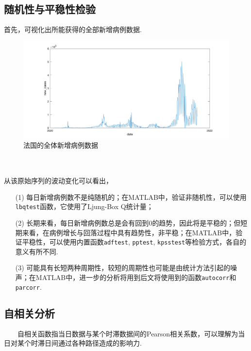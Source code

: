 \documentclass[a4paper, titlepage]{article}
\begin{document}
        \subsection{随机性与平稳性检验}
        首先，可视化出所能获得的全部新增病例数据.\\
\begin{minipage}{\textwidth}
\begin{figure}[H]
    \centering
    \includegraphics[width=\textwidth]{./images/France_Whole.png}
    \vspace{-3em}
    \caption{法国的全体新增病例数据}
    \label{images:France_Whole}
\end{figure}
\end{minipage}\\\quad\\
从该原始序列的波动变化可以看出，
\begin{enumerate}[itemsep=-2pt,topsep=1pt]
    \item [(1)] 每日新增病例数不是纯随机的；{\kaishu 在MATLAB中，验证非随机性，可以使用\texttt{lbqtest}函数，它使用了Ljung-Box Q统计量；}
    \item [(2)] 长期来看，每日新增病例数总是会有回到$0$的趋势，因此将是平稳的；但短期来看，在病例增长与回落过程中具有趋势性，非平稳；{\kaishu 在MATLAB中，验证平稳性，可以使用内置函数\texttt{adftest}, \texttt{pptest}, \texttt{kpsstest}等检验方式，各自的意义有所不同.}
    \item [(3)] 可能具有长短两种周期性，较短的周期性也可能是由统计方法引起的噪声；{\kaishu 在MATLAB中，进一步的分析将用到后文将使用到的函数\texttt{autocorr}和\texttt{parcorr}.}
\end{enumerate}

    \subsection{自相关分析}
    　　自相关函数指当日数据与某个时滞数据间的Pearson相关系数，可以理解为当日对某个时滞日间通过各种路径造成的影响力.
\end{document}
